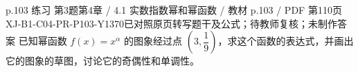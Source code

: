 \par\noindent\begin{minipage}{\linewidth}
\begin{bankitem}{p.103 练习 第3题}{第4章 / 4.1 实数指数幂和幂函数 / 教材 p.103 / PDF 第110页}{XJ-B1-C04-PR-P103-Y1370}{已对照原页转写题干及公式；待教师复核；未制作答案}
已知幂函数 $f(x)=x^\alpha$ 的图象经过点 $\left(3,\dfrac19\right)$，求这个函数的表达式，并画出它的图象的草图，讨论它的奇偶性和单调性。
\end{bankitem}
\end{minipage}\par\medskip
